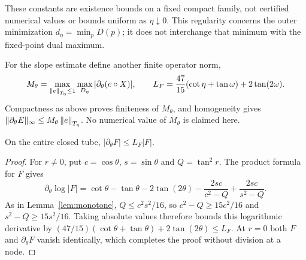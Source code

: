 \documentclass[11pt,a4paper]{article}
\begin{document}
These constants are existence bounds on a fixed compact family, not
certified numerical values or bounds uniform as $\eta\downarrow0$.
This regularity concerns the outer minimization $d_\eta=\min_pD(p)$;
it does not interchange that minimum with the fixed-point dual maximum.

For the slope estimate define another finite operator norm,
\begin{equation}\label{eq:Mtheta}
 M_\theta=\max_{\left\lVert e\right\rVert_{T_\eta}\le1}\max_{D_\eta}
                 |\partial_\theta(e\circ X)|,
 \qquad
 L_F=\frac{47}{15}(\cot\eta+\tan\omega)+2\tan(2\omega).
\end{equation}
Compactness as above proves finiteness of $M_\theta$, and homogeneity
gives $\|\partial_\theta E\|_\infty\le M_\theta\left\lVert e\right\rVert_{T_\eta}$.
No numerical value of $M_\theta$ is claimed here.

\begin{lemma}\label{lem:relative}
On the entire closed tube, $|\partial_\theta F|\le L_F|F|$.
\end{lemma}
\begin{proof}
For $r\ne0$, put $c=\cos\theta$, $s=\sin\theta$ and
$Q=\tan^2r$. The product formula for $F$ gives
\[
 \partial_\theta\log|F|
 =\cot\theta-\tan\theta-2\tan(2\theta)
   -\frac{2sc}{c^2-Q}+\frac{2sc}{s^2-Q}.
\]
As in Lemma~\ref{lem:monotone}, $Q\le c^2s^2/16$, so
$c^2-Q\ge15c^2/16$ and $s^2-Q\ge15s^2/16$.
Taking absolute values therefore bounds this logarithmic derivative
by $(47/15)(\cot\theta+\tan\theta)+2\tan(2\theta)\le L_F$.
At $r=0$ both $F$ and $\partial_\theta F$ vanish identically,
which completes the proof without division at a node.
\end{proof}
\end{document}

